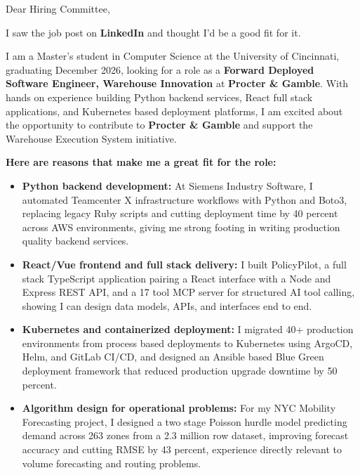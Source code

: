 \documentclass[11pt]{letter}
\date{}
\begin{document}
\begin{letter}{}

\opening{Dear Hiring Committee,}

I saw the job post on \textbf{LinkedIn} and thought I'd be a good fit for it.

I am a Master's student in Computer Science at the University of Cincinnati, graduating December 2026, looking for a role as a \textbf{Forward Deployed Software Engineer, Warehouse Innovation} at \textbf{Procter \& Gamble}. With hands on experience building Python backend services, React full stack applications, and Kubernetes based deployment platforms, I am excited about the opportunity to contribute to \textbf{Procter \& Gamble} and support the Warehouse Execution System initiative.

\textbf{Here are reasons that make me a great fit for the role:}

\begin{itemize}[leftmargin=*, itemsep=0.45em]
    \item \textbf{Python backend development:} At Siemens Industry Software, I automated Teamcenter X infrastructure workflows with Python and Boto3, replacing legacy Ruby scripts and cutting deployment time by 40 percent across AWS environments, giving me strong footing in writing production quality backend services.

    \item \textbf{React/Vue frontend and full stack delivery:} I built PolicyPilot, a full stack TypeScript application pairing a React interface with a Node and Express REST API, and a 17 tool MCP server for structured AI tool calling, showing I can design data models, APIs, and interfaces end to end.

    \item \textbf{Kubernetes and containerized deployment:} I migrated 40+ production environments from process based deployments to Kubernetes using ArgoCD, Helm, and GitLab CI/CD, and designed an Ansible based Blue Green deployment framework that reduced production upgrade downtime by 50 percent.

    \item \textbf{Algorithm design for operational problems:} For my NYC Mobility Forecasting project, I designed a two stage Poisson hurdle model predicting demand across 263 zones from a 2.3 million row dataset, improving forecast accuracy and cutting RMSE by 43 percent, experience directly relevant to volume forecasting and routing problems.


\end{itemize}
\end{letter}
\end{document}
